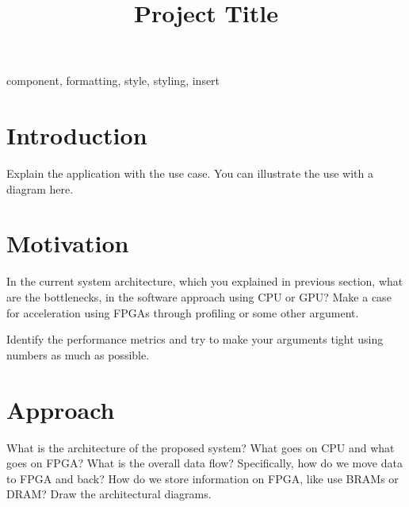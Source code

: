 \documentclass[conference]{IEEEtran}
\begin{document}
\title{Project Title}

\author{
\and
{}
}

\maketitle

\begin{abstract}
\end{abstract}

\begin{IEEEkeywords}
component, formatting, style, styling, insert
\end{IEEEkeywords}

\section{Introduction}
Explain the application with the use case.  You can illustrate the use with a
diagram here.

\section{Motivation}
In the current system architecture, which you explained in previous section,
what are the bottlenecks, in the software approach using CPU or GPU?  Make a
case for acceleration using FPGAs through profiling or some other argument. 

Identify the performance metrics and try to make your arguments tight using 
numbers as much as possible.

\section{Approach}

What is the architecture of the proposed system? What goes on CPU and what 
goes on FPGA? What is the overall data flow? Specifically, how do we move data
to FPGA and back? How do we store information on FPGA, like use BRAMs or DRAM?
Draw the architectural diagrams. 
\end{document}
